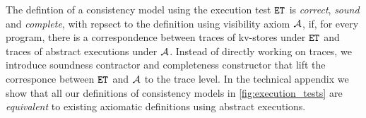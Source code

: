 The defintion of a consistency model using the execution test \( \et \) is \emph{correct}, 
\ie \emph{sound} and \emph{complete},
with repsect to the definition using visibility axiom \( \visaxioms \),
if, for every program, there is a correspondence
between traces of kv-stores under \( \et \) and 
traces of abstract executions under \( \visaxioms \).
Instead of directly working on traces,
we introduce soundness contractor and completeness constructor
that lift the corresponce between \( \et \) and \( \visaxioms \) to the trace level. 
In the technical appendix we show that 
all our definitions of consistency models in \cref{fig:execution_tests} 
are \emph{equivalent} to existing axiomatic definitions using abstract executions.
